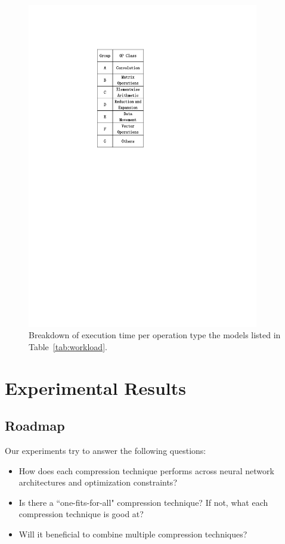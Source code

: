 \begin{figure}
\begin{minipage}[c]{0.16\textwidth}
\includegraphics[width=0.9\textwidth]{figure/break11label1.pdf}
\end{minipage}
\caption{Breakdown of execution time per operation type the models listed in Table~\ref{tab:workload}.}
 \label{fig:breakdown11}
\end{figure}




\section{Experimental Results}


\subsection{Roadmap}
Our experiments try to answer the following questions:

\begin{itemize}
\item How does each compression technique performs across neural network architectures and optimization constraints?
\item Is there a ``one-fits-for-all" compression technique? If not, what each compression technique is good at?
\item Will it beneficial to combine multiple compression techniques?
\end{itemize}


